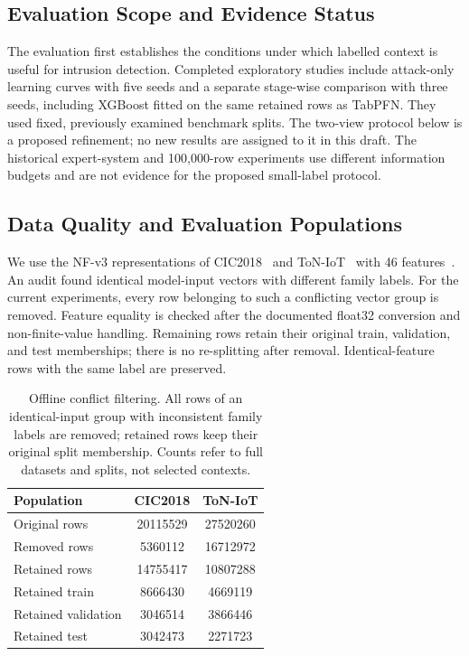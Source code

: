 \documentclass[sigconf,anonymous,pbalance]{acmart}
\begin{document}
\subsection{Evaluation Scope and Evidence Status}
The evaluation first establishes the conditions under which labelled context is useful for intrusion detection. Completed exploratory studies include attack-only learning curves with five seeds and a separate stage-wise comparison with three seeds, including XGBoost fitted on the same retained rows as TabPFN. They used fixed, previously examined benchmark splits. The two-view protocol below is a proposed refinement; no new results are assigned to it in this draft. The historical expert-system and 100,000-row experiments use different information budgets and are not evidence for the proposed small-label protocol.

\subsection{Data Quality and Evaluation Populations}
We use the NF-v3 representations of CIC2018~\cite{cic2018official} and ToN-IoT~\cite{moustafa_toniot_2021} with 46 features~\cite{luay2025NetFlowDatasetsV3}. An audit found identical model-input vectors with different family labels. For the current experiments, every row belonging to such a conflicting vector group is removed. Feature equality is checked after the documented float32 conversion and non-finite-value handling. Remaining rows retain their original train, validation, and test memberships; there is no re-splitting after removal. Identical-feature rows with the same label are preserved.

\begin{table}[t]
\centering
\caption{Offline conflict filtering. All rows of an identical-input group with inconsistent family labels are removed; retained rows keep their original split membership. Counts refer to full datasets and splits, not selected contexts.}
\label{tab:quality}
\begin{tabular}{@{}l *{2}{S[table-format=8.0]}@{}}
\toprule
Population & {CIC2018} & {ToN-IoT} \\
\midrule
Original rows & 20115529 & 27520260 \\
Removed rows & 5360112 & 16712972 \\
Retained rows & 14755417 & 10807288 \\
Retained train & 8666430 & 4669119 \\
Retained validation & 3046514 & 3866446 \\
Retained test & 3042473 & 2271723 \\
\bottomrule
\end{tabular}
\end{table}
\end{document}
